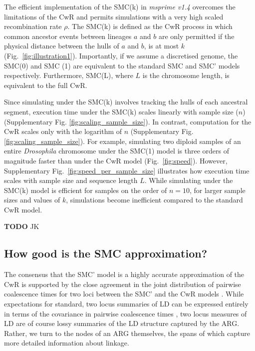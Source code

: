 \documentclass[9pt,twocolumn,twoside,lineno]{gsajnl}
\begin{document}
The efficient implementation of the SMC(k) in \textit{msprime v1.4} overcomes the limitations of the CwR and permits simulations with a very high scaled recombination rate $\rho$. The SMC(k) is defined as the CwR process in which common ancestor events between lineages $a$ and $b$ are only permitted if the physical distance between the hulls of $a$ and $b$, is at most $k$ (Fig.~\ref{fig:illustration1}). Importantly, if we assume a discretised genome, the SMC(0) and SMC (1) are equivalent to the standard SMC and SMC' models respectively. Furthermore, SMC(L), where $L$ is the chromosome length, is equivalent to the full CwR.

Since simulating under the SMC(k) involves tracking the hulls of each ancestral segment, execution time under the SMC(k) scales linearly with sample size ($n$) (Supplementary Fig. \ref{fig:scaling_sample_size}). In contrast, computation for the CwR scales only with the logarithm of $n$ (Supplementary Fig. \ref{fig:scaling_sample_size}). For example, simulating two diploid samples of an entire \textit{Drosophila} chromosome under the SMC(1) model is three orders of magnitude faster than under the CwR model (Fig.~\ref{fig:speed}). However, Supplementary Fig.~\ref{fig:speed_per_sample_size} illustrates how execution time scales with sample size and sequence length $L$. While simulating under the SMC(k) model is efficient for samples on the order of $n=10$, for larger sample sizes and values of $k$, simulations become inefficient compared to the standard CwR model. 

\textbf{TODO} JK



\subsection{How good is the SMC approximation?}

The consensus that the SMC' model is a highly accurate approximation of the CwR is supported by the close agreement in the joint distribution of pairwise coalescence times for two loci between the SMC' and the CwR models \citep{wilton_smc_2015}. While expectations for standard, two locus summaries of LD can be expressed entirely in terms of the covariance in pairwise coalescence times \citep{mcVean2002genealogical}, two locus measures of LD are of course lossy summaries of the LD structure captured by the ARG. Rather, we turn to the nodes of an ARG themselves, the spans of which capture more detailed information about linkage. 
\end{document}
